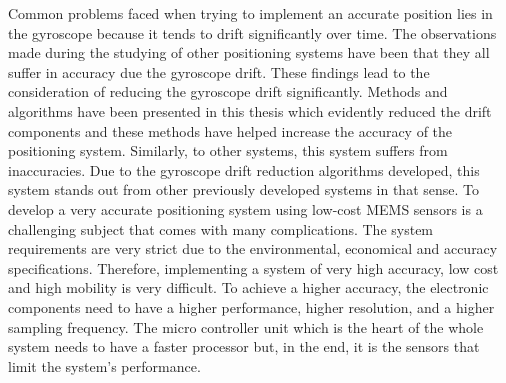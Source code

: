 Common problems faced when trying to implement an accurate position lies in the gyroscope because it tends to drift significantly over time. The observations made during the studying of other positioning systems have been that they all suffer in accuracy due the gyroscope drift. These findings lead to the consideration of reducing the gyroscope drift significantly. Methods and algorithms have been presented in this thesis which evidently reduced the drift components and these methods have helped increase the accuracy of the positioning system. Similarly, to other systems, this system suffers from inaccuracies. Due to the gyroscope drift reduction algorithms developed, this system stands out from other previously developed systems in that sense. To develop a very accurate positioning system using low-cost MEMS sensors is a challenging subject that comes with many complications. The system requirements are very strict due to the environmental, economical and accuracy specifications. Therefore, implementing a system of very high accuracy, low cost and high mobility is very difficult. To achieve a higher accuracy, the electronic components need to have a higher performance, higher resolution, and a higher sampling frequency. The micro controller unit which is the heart of the whole system needs to have a faster processor but, in the end, it is the sensors that limit the system's performance.

